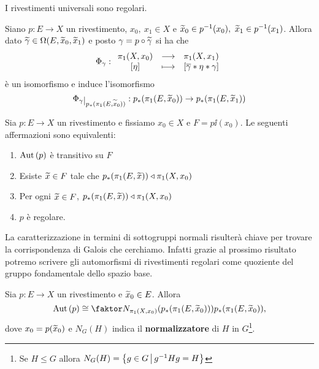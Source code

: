 \begin{multicols*}{2}
\begin{proposition}\label{RivestimentiUniversaliSonoRegolari}
I rivestimenti universali sono regolari.
\end{proposition}

\begin{lemma}\label{LemmaConiugioImmaginiTramiteRivestimentoDiGruppiFondamentali}
Siano $p:E\to X$ un rivestimento, $x_0,\ x_1\in X$ e $\widetilde{x}_0\in p^{-1}(x_0),\ \widetilde{x}_1\in p^{-1}(x_1)$. Allora dato $\widetilde{\gamma} \in \Omega(E,\widetilde{x}_0,\widetilde{x}_1)$ e posto $\gamma=p\circ \widetilde{\gamma}$ si ha che
\[\Phi_\gamma:\begin{array}{ccc} {\pi_1(X,x_0)} & \longrightarrow & {\pi_1(X,x_1)}\\ {[\eta]} & \longmapsto & {[\overline{\gamma}\ast \eta\ast \gamma]} \end{array}\]
\`e un isomorfismo e induce l'isomorfismo
\[\Phi_\gamma\res{p_\ast(\gf E{\wt x_0})}:p_\ast(\gf E{\wt x_0})\to p_\ast(\gf E{\wt x_1})\]
\end{lemma}


\begin{theorem}\label{CaratterizzazioniRivestimentiRegolari}
Sia $p:E\to X$ un rivestimento e fissiamo $x_0\in X$ e $F=p\ii(x_0)$. Le seguenti affermazioni sono equivalenti:
\begin{enumerate}[noitemsep]
\item $\mathrm{Aut}\,(p)$ \`e transitivo su $F$
\item Esiste $\widetilde{x}\in F$ tale che $p_\ast(\pi_1(E,\widetilde{x}))\triangleleft \pi_1(X,x_0)$
\item Per ogni $\widetilde{x}\in F$, $p_\ast(\pi_1(E,\widetilde{x}))\triangleleft \pi_1(X,x_0)$
\item $p$ \`e regolare.
\end{enumerate}
\end{theorem}
\bigskip

\noindent La caratterizzazione in termini di sottogruppi normali risulter\`a chiave per trovare la corrispondenza di Galois che cerchiamo. Infatti grazie al prossimo risultato potremo scrivere gli automorfismi di rivestimenti regolari come quoziente del gruppo fondamentale dello spazio base.


\begin{theorem}\label{AutomorfismiDiRivestimentiInTerminiDelGruppoFondamentale}
Sia $p:E\to X$ un rivestimento e $\widetilde{x}_0\in E$. Allora
\[\Aut(p)\cong \quot{N_{\gf X{x_0}}(p_\ast(\gf E{\wt x_0}))}{p_\ast(\gf E{\wt x_0})},\]
dove $x_0=p(\widetilde{x}_0)$ e  $N_G(H)$ indica il \textbf{normalizzatore} di $H$ in $G$\footnote{Se $H\leq G$ allora $N_G(H)=\left\{g\in G\,\middle|\, g^{-1} Hg=H\right\}$}.
\end{theorem}


\end{multicols*}
